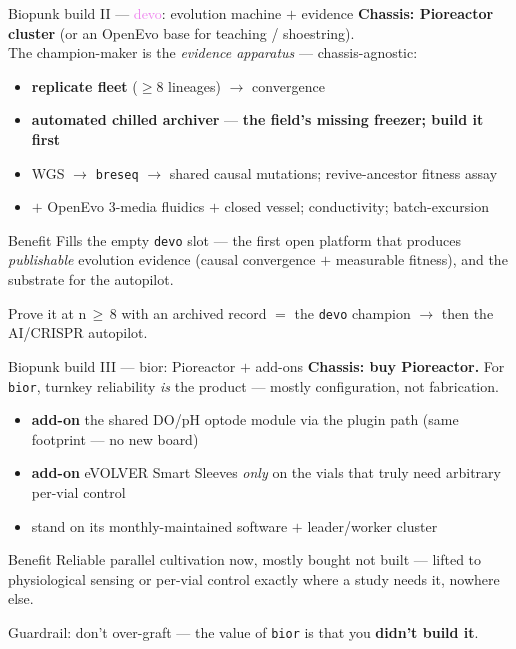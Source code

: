 \documentclass[aspectratio=169,11pt]{beamer}
\newcommand{\ac}[1]{\textcolor{accent}{\textbf{#1}}}
\begin{document}
\begin{frame}{Biopunk build II --- \textcolor{violet}{devo}: evolution machine $+$ evidence}
  \textbf{Chassis: Pioreactor cluster} (or an OpenEvo base for teaching / shoestring). \\
  The champion-maker is the \emph{evidence apparatus} --- chassis-agnostic:
  \begin{itemize}\small
    \item \textbf{replicate fleet} ($\ge$8 lineages) $\to$ convergence
    \item \textbf{automated chilled archiver} --- \ac{the field's missing freezer; build it first}
    \item WGS $\to$ \texttt{breseq} $\to$ shared causal mutations; revive-ancestor fitness assay
    \item $+$ OpenEvo 3-media fluidics $+$ closed vessel; conductivity; batch-excursion
  \end{itemize}
  \begin{block}{Benefit}
  \small Fills the empty \texttt{devo} slot --- the first open platform that produces \emph{publishable} evolution evidence (causal convergence $+$ measurable fitness), and the substrate for the autopilot.
  \end{block}
  \begin{center}\small Prove it at n$\,\ge\,$8 with an archived record $=$ the \texttt{devo} champion $\to$ then the AI/CRISPR autopilot.\end{center}
\end{frame}

\begin{frame}{Biopunk build III --- \textcolor{warn}{bior}: Pioreactor $+$ add-ons}
  \textbf{Chassis: buy Pioreactor.} For \texttt{bior}, turnkey reliability \emph{is} the product --- mostly configuration, not fabrication.
  \begin{itemize}\small
    \item \textbf{add-on} the shared DO/pH optode module via the plugin path (same footprint --- no new board)
    \item \textbf{add-on} eVOLVER Smart Sleeves \emph{only} on the vials that truly need arbitrary per-vial control
    \item stand on its monthly-maintained software $+$ leader/worker cluster
  \end{itemize}
  \begin{block}{Benefit}
  \small Reliable parallel cultivation now, mostly bought not built --- lifted to physiological sensing or per-vial control exactly where a study needs it, nowhere else.
  \end{block}
  \begin{center}\small Guardrail: don't over-graft --- the value of \texttt{bior} is that you \ac{didn't build it}.\end{center}
\end{frame}
\end{document}
